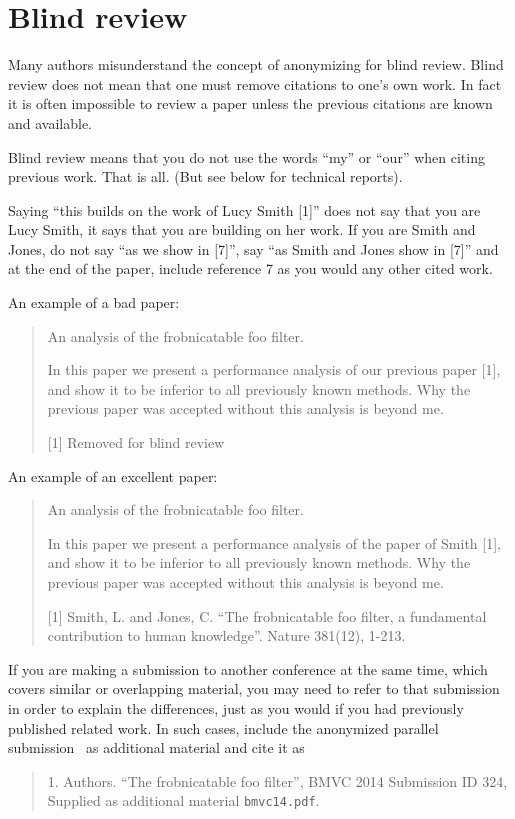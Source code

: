 \documentclass[runningheads]{llncs}
\begin{document}
\section{Blind review}
\label{sec:blind}

Many authors misunderstand the concept of anonymizing for blind
review.  Blind review does not mean that one must remove
citations to one's own work. In fact it is often impossible to
review a paper unless the previous citations are known and
available.

Blind review means that you do not use the words ``my'' or ``our''
when citing previous work.  That is all.  (But see below for
technical reports).

Saying ``this builds on the work of Lucy Smith [1]'' does not say
that you are Lucy Smith, it says that you are building on her
work.  If you are Smith and Jones, do not say ``as we show in
[7]'', say ``as Smith and Jones show in [7]'' and at the end of the
paper, include reference 7 as you would any other cited work.

An example of a bad paper:
\begin{quote}
\begin{center}
    An analysis of the frobnicatable foo filter.
\end{center}

   In this paper we present a performance analysis of our
   previous paper [1], and show it to be inferior to all
   previously known methods.  Why the previous paper was
   accepted without this analysis is beyond me.

   [1] Removed for blind review
\end{quote}


An example of an excellent paper:

\begin{quote}
\begin{center}
     An analysis of the frobnicatable foo filter.
\end{center}

   In this paper we present a performance analysis of the
   paper of Smith [1], and show it to be inferior to
   all previously known methods.  Why the previous paper
   was accepted without this analysis is beyond me.

   [1] Smith, L. and Jones, C. ``The frobnicatable foo
   filter, a fundamental contribution to human knowledge''.
   Nature 381(12), 1-213.
\end{quote}

If you are making a submission to another conference at the same
time, which covers similar or overlapping material, you may need
to refer to that submission in order to explain the differences,
just as you would if you had previously published related work. In
such cases, include the anonymized parallel
submission~\cite{Authors14} as additional material and cite it as
\begin{quote}
1. Authors. ``The frobnicatable foo filter'', BMVC 2014 Submission
ID 324, Supplied as additional material {\tt bmvc14.pdf}.
\end{quote}
\end{document}
